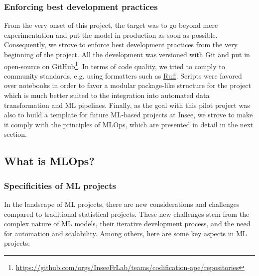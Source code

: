 \subsubsection{Enforcing best development practices}

From the very onset of this project, the target was to go beyond mere experimentation and put the model in production as soon as possible. Consequently, we strove to enforce best development practices from the very beginning of the project. All the development was versioned with Git and put in open-source on GitHub\footnote{\url{https://github.com/orgs/InseeFrLab/teams/codification-ape/repositories}}. In terms of code quality, we tried to comply to community standards, e.g. using formatters such as \href{https://github.com/astral-sh/ruff}{Ruff}. Scripts were favored over notebooks in order to favor a modular package-like structure for the project which is much better suited to the integration into automated data transformation and ML pipelines. Finally, as the goal with this pilot project was also to build a template for future ML-based projects at Insee, we strove to make it comply with the principles of MLOps, which are presented in detail in the next section.



\subsection{What is MLOps?}


\subsubsection{Specificities of ML projects}

In the landscape of ML projects, there are new considerations and challenges compared to traditional statistical projects. These new challenges stem from the complex nature of ML models, their iterative development process, and the need for automation and scalability. Among others, here are some key aspects in ML projects:

